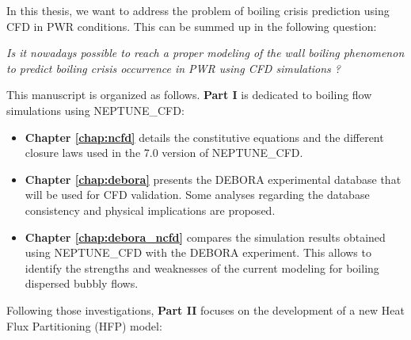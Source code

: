In this thesis, we want to address the problem of boiling crisis prediction using CFD in PWR conditions. This can be summed up in the following question:

\npar

\begin{center}
\textit{Is it nowadays possible to reach a proper modeling of the wall boiling phenomenon to predict boiling crisis occurrence in PWR using CFD simulations ?}
\end{center}
%
%
%
%
%
%

\npar

This manuscript is organized as follows. \textbf{Part I} is dedicated to boiling flow simulations using NEPTUNE\_CFD:

\begin{itemize}
\item \textbf{Chapter \ref{chap:ncfd}} details the constitutive equations and the different closure laws used in the 7.0 version of NEPTUNE\_CFD. 

\item \textbf{Chapter \ref{chap:debora}} presents the DEBORA experimental database that will be used for CFD validation. Some analyses regarding the database consistency and physical implications are proposed.

\item \textbf{Chapter \ref{chap:debora_ncfd}} compares the simulation results obtained using NEPTUNE\_CFD with the DEBORA experiment. This allows to identify the strengths and weaknesses of the current modeling for boiling dispersed bubbly flows.

\end{itemize}


Following those investigations, \textbf{Part II} focuses on the development of a new Heat Flux Partitioning (HFP) model:

